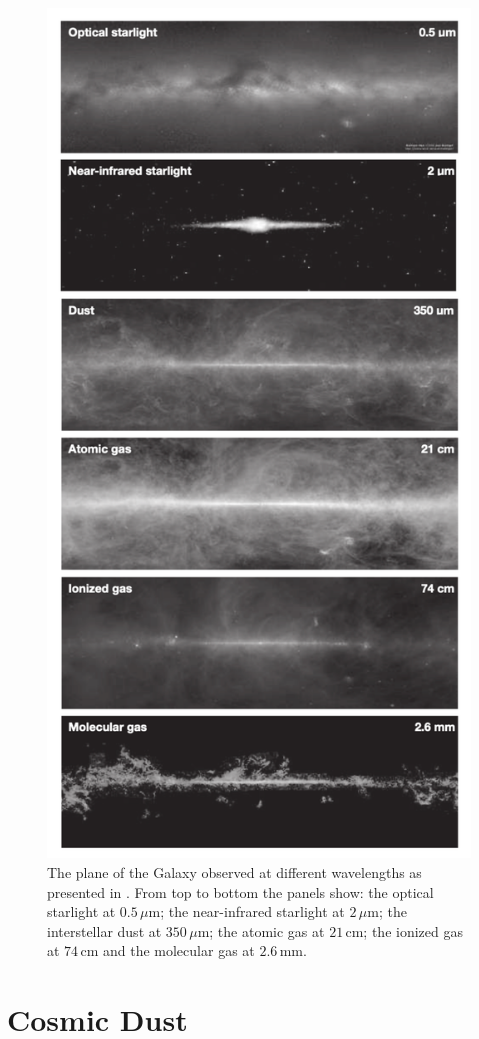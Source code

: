 \begin{figure}
    \centering
	\includegraphics[width=0.75\columnwidth, height=0.92\textheight]{Figures/interstellar_medium.pdf}
	\caption{The plane of the Galaxy observed at different wavelengths as presented in \citealt{Williams_2021}. From top to bottom the panels show: the optical starlight at $0.5\,\mu$m; the near-infrared starlight at $2\,\mu$m; the interstellar dust at $350\,\mu$m; the atomic gas at $21\,$cm; the ionized gas at $74\,$cm and the molecular gas at $2.6\,$mm.}
	\label{fig:interstellar_medium}
\end{figure}

\section{Cosmic Dust}

